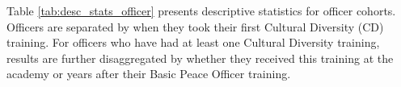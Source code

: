 \begin{tablenotes}
\scriptsize{Table \ref{tab:desc_stats_officer} presents descriptive statistics for officer cohorts. Officers are separated by when they took their first Cultural \newline Diversity (CD) training. For officers who have had at least one Cultural Diversity training, results are further \newline disaggregated by whether they received this training at the academy or years after their Basic Peace Officer training.}
\end{tablenotes}